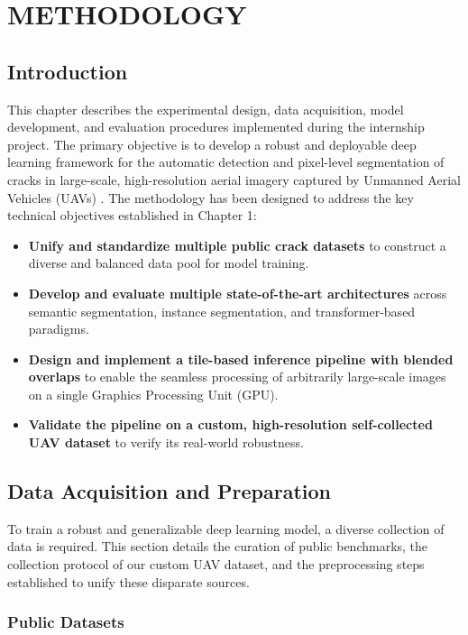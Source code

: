 \chapter{METHODOLOGY}

\section{Introduction}

\hs This chapter describes the experimental design, data acquisition, model development, and evaluation procedures implemented during the internship project. The primary objective is to develop a robust and deployable deep learning framework for the automatic detection and pixel-level segmentation of cracks in large-scale, high-resolution aerial imagery captured by Unmanned Aerial Vehicles (UAVs) \cite{zhang-2024a, chen-2024}. The methodology has been designed to address the key technical objectives established in Chapter 1:

\begin{itemize}
    \item \textbf{Unify and standardize multiple public crack datasets} to construct a diverse and balanced data pool for model training.
    \item \textbf{Develop and evaluate multiple state-of-the-art architectures} across semantic segmentation, instance segmentation, and transformer-based paradigms.
    \item \textbf{Design and implement a tile-based inference pipeline with blended overlaps} to enable the seamless processing of arbitrarily large-scale images on a single Graphics Processing Unit (GPU).
    \item \textbf{Validate the pipeline on a custom, high-resolution self-collected UAV dataset} to verify its real-world robustness.
\end{itemize}

\section{Data Acquisition and Preparation}

\hs To train a robust and generalizable deep learning model, a diverse collection of data is required. This section details the curation of public benchmarks, the collection protocol of our custom UAV dataset, and the preprocessing steps established to unify these disparate sources.

\subsection{Public Datasets}
\label{subsec:public-datasets}

